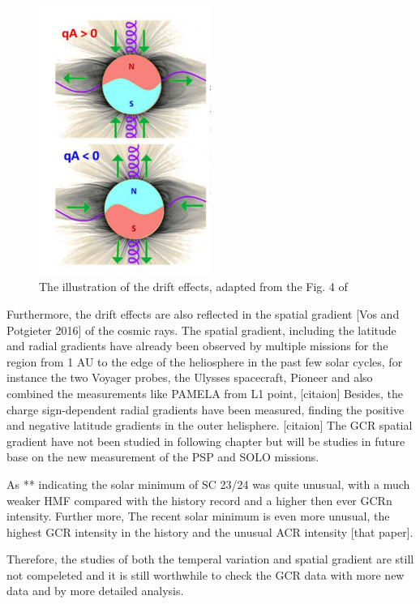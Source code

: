 \begin{figure}
	\centering
	\includegraphics[width = 0.5\textwidth]{images/drift_effect.png}
	\caption{The illustration of the drift effects, adapted from the Fig. 4 of \citep{Rankim 2020?}}
	\label{Fig:drift_effect}	
\end{figure}

Furthermore, the drift effects are also reflected in the spatial gradient [Vos and Potgieter 2016] of the cosmic rays. 
The spatial gradient, including the latitude and radial gradients have already been observed by multiple missions for the region from 1 AU to the edge of the heliosphere in the past few solar cycles, for instance the two Voyager probes, the Ulysses spacecraft, Pioneer and also combined the measurements like PAMELA from L1 point, [citaion]
Besides, the charge sign-dependent radial gradients have been measured, finding the positive and negative latitude gradients in the outer helisphere. [citaion]
The GCR spatial gradient have not been studied in following chapter but will be studies in future base on the new measurement of the PSP and SOLO missions.

As ** indicating the solar minimum of SC 23/24 was quite unusual, with a much weaker \ac{HMF} compared with the history record and a higher then ever GCRn intensity. Further more, The recent solar minimum 
is even more unusual, the highest GCR intensity in the history and the unusual ACR intensity [that paper]. 




Therefore, the studies of both the temperal variation and spatial gradient are still not compeleted and it is still worthwhile to check the GCR data with more new data and by more detailed analysis.


